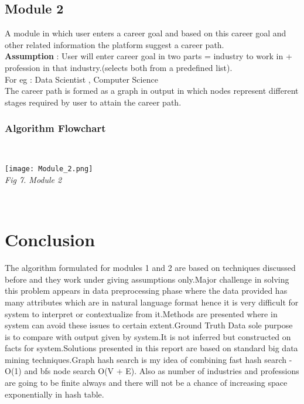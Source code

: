 \documentclass[journal]{IEEEtran}
\begin{document}
    \subsection{Module 2}
     A module in which user enters a career goal and based on this career goal and other related information the platform suggest a career path. 
     \\\textbf{Assumption} : User will enter career goal in two parts = industry to work in  + profession in that industry.(selects both from a predefined list).
     \\For eg : Data Scientist , Computer Science
     \\The career path is formed as a graph in output in which nodes represent different stages required by user to attain the career path.
     \\
        \subsubsection{\textbf{Algorithm Flowchart}}
        \\
            \begin{center}
                \texttt{[image: Module\_2.png]}
                \\
                \caption{\textit{Fig 7. Module 2}}
            \end{center}
        \\  
\section{\textbf{Conclusion}}
The algorithm formulated for modules 1 and 2 are based on techniques discussed before and they work under giving assumptions only.Major challenge in solving this problem appears in data preprocessing phase where the data provided has many attributes which are in natural language format hence it is very difficult for system to interpret or contextualize from it.Methods are presented where in system can avoid these issues to certain extent.Ground Truth Data sole purpose is to compare with output given by system.It is not inferred but constructed on facts for system.Solutions presented in this report are based on standard big data mining techniques.Graph hash search is my idea of combining fast hash search - O(1) and bfs node search O(V + E).
Also as number of industries and professions are going to be finite always and there will not be a chance of increasing space exponentially in hash table.
\end{document}

